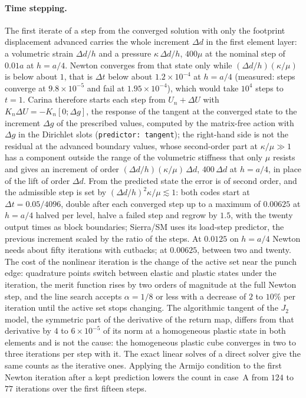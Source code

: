 \documentclass{article}
\newcommand{\code}[1]{\texttt{#1}}
\theoremstyle{definition}
\theoremstyle{plain}
\begin{document}
\paragraph{Time stepping.} The first iterate of a step from the converged
solution with only the footprint displacement advanced carries the whole
increment $\Delta d$ in the first element layer: a volumetric strain
$\Delta d/h$ and a pressure $\kappa\,\Delta d/h$, $400\mu$ at the nominal
step of $0.01a$ at $h = a/4$. Newton converges from that state only while
$(\Delta d/h)(\kappa/\mu)$ is below about $1$, that is $\Delta t$ below
about $1.2 \times 10^{-4}$ at $h = a/4$ (measured: steps converge at
$9.8 \times 10^{-5}$ and fail at $1.95 \times 10^{-4}$), which would take
$10^4$ steps to $t = 1$. Carina therefore starts each step from
$U_n + \Delta U$ with $K_n \Delta U = -K_n [0; \Delta g]$, the response of
the tangent at the converged state to the increment $\Delta g$ of the
prescribed values, computed by the matrix-free action with $\Delta g$ in the
Dirichlet slots (\code{predictor: tangent}); the right-hand side is not the
residual at the advanced boundary values, whose second-order part at
$\kappa/\mu \gg 1$ has a component outside the range of the volumetric
stiffness that only $\mu$ resists and gives an increment of order
$(\Delta d/h)(\kappa/\mu)\,\Delta d$, $400\,\Delta d$ at $h = a/4$, in
place of the lift of order $\Delta d$. From the predicted state the error
is of second order, and the admissible step is set by
$(\Delta d/h)^2 \kappa/\mu \lesssim 1$: both codes start at
$\Delta t = 0.05/4096$, double after each converged step up to a maximum of
$0.00625$ at $h = a/4$ halved per level, halve a failed step and regrow by
$1.5$, with the twenty output times as block boundaries; Sierra/SM uses its
load-step predictor, the previous increment scaled by the ratio of the steps.
At $0.0125$ on $h = a/4$ Newton needs about fifty iterations with cutbacks;
at $0.00625$, between two and twenty. The cost of the nonlinear iteration is
the change of the active set near the punch edge: quadrature points switch
between elastic and plastic states under the iteration, the merit function
rises by two orders of magnitude at the full Newton step, and the line
search accepts $\alpha = 1/8$ or less with a decrease of $2$ to $10\%$ per
iteration until the active set stops changing. The algorithmic tangent of
the $J_2$ model, the symmetric part of the derivative of the return map,
differs from that derivative by $4$ to $6 \times 10^{-5}$ of its norm at a
homogeneous plastic state in both elements and is not the cause: the
homogeneous plastic cube converges in two to three iterations per step with
it. The exact linear solves of a direct solver give the same counts as the
iterative ones. Applying the Armijo condition to the first Newton iteration
after a kept prediction lowers the count in case~A from $124$ to $77$
iterations over the first fifteen steps.
\end{document}
